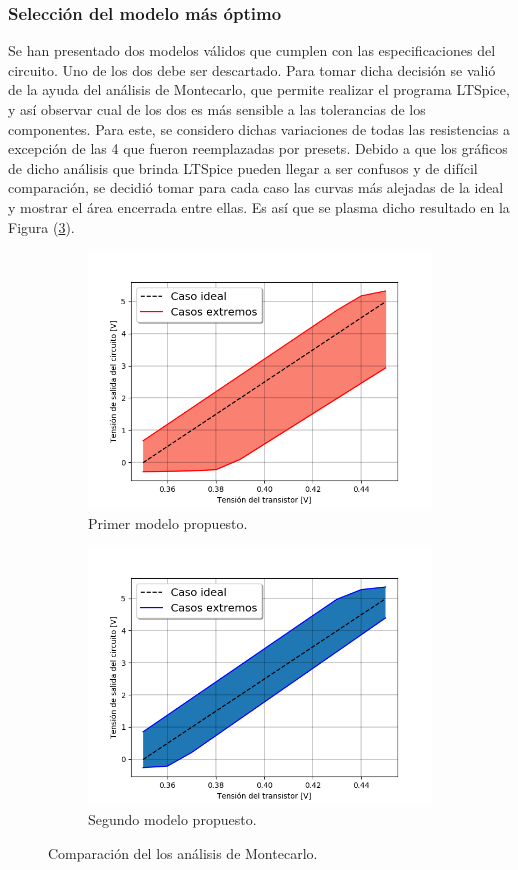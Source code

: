 \subsubsection{Selección del modelo más óptimo}

Se han presentado dos modelos válidos que cumplen con las especificaciones del circuito. Uno de los dos debe ser descartado. Para tomar dicha decisión se valió de la ayuda del análisis de Montecarlo, que permite realizar el programa LTSpice, y así observar cual de los dos es más sensible a las tolerancias de los componentes. Para este, se considero dichas variaciones de todas las resistencias a excepción de las 4 que fueron reemplazadas por presets. Debido a que los gráficos de dicho análisis que brinda LTSpice pueden llegar a ser confusos y de difícil comparación, se decidió tomar para cada caso las curvas más alejadas de la ideal y mostrar el área encerrada entre ellas. Es así que se plasma dicho resultado en la Figura (\ref{fig:mccomp}). 

\begin{figure}[H]
\centering
\begin{subfigure}{.8\textwidth}
  \centering
  \includegraphics[width=.85\linewidth]{Ejercicio6/Imagenes/MC-1M.png}
  \caption{Primer modelo propuesto.}
  \label{fig:mcm1}
\end{subfigure}
\begin{subfigure}{\textwidth}
  \centering
  \includegraphics[width=.7\linewidth]{Ejercicio6/Imagenes/MC-2M.png}
  \caption{Segundo modelo propuesto.}
  \label{fig:mcm2}
\end{subfigure}
\caption{Comparación del los análisis de Montecarlo.}
\label{fig:mccomp}
\end{figure}

